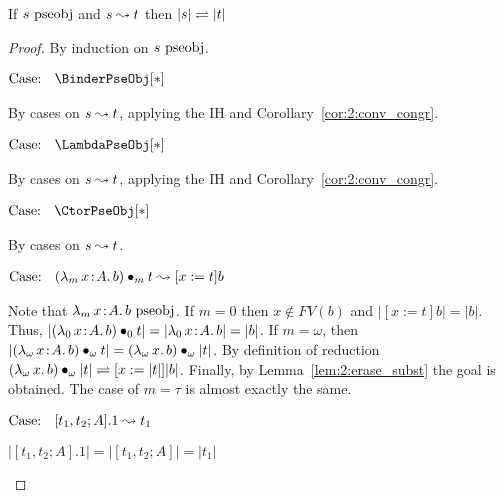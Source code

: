 \begin{lemma}
    If $s~\mbox{\normalfont pseobj}$ and $s \leadsto t$ then $|s| \rightleftharpoons |t|$
    \label{lem:2:erase_pseobj_red}
\end{lemma}
\begin{proof}
    By induction on $s~\mbox{\normalfont pseobj}$.

    $\text{Case: }\begin{array}{c} \BinderPseObj[*] \end{array}$
    \begin{proofcase}
        By cases on $s \leadsto t$, applying the IH and Corollary~\ref{cor:2:conv_congr}.
    \end{proofcase}

    $\text{Case: }\begin{array}{c} \LambdaPseObj[*] \end{array}$
    \begin{proofcase}
        By cases on $s \leadsto t$, applying the IH and Corollary~\ref{cor:2:conv_congr}.
    \end{proofcase}

    $\text{Case: }\begin{array}{c} \CtorPseObj[*] \end{array}$
    \begin{proofcase}
        By cases on $s \leadsto t$.

        $\text{Case: }\begin{array}{c} ({\lambda_m}\, x\! : \! A.\, b) \bullet_{m} t \leadsto [x := t]b \end{array}$
        \begin{proofcase}
            Note that ${\lambda_m}\, x\! : \! A.\, b~\mbox{\normalfont pseobj}$.
            If $m = 0$ then $x \notin FV(b)$ and $|[x := t]b| = |b|$.
            Thus, $|({\lambda_0}\, x\! : \! A.\, b) \bullet_{0} t| = |{\lambda_0}\, x\! : \! A.\, b| = |b|$.
            If $m = \omega$, then $|({\lambda_\omega}\, x\! : \! A.\, b) \bullet_{\omega} t| = ({\lambda_\omega}\, x.\, b) \bullet_{\omega} |t|$.
            By definition of reduction $({\lambda_\omega}\, x.\, b) \bullet_{\omega} |t| \rightleftharpoons [x := |t|]|b|$.
            Finally, by Lemma~\ref{lem:2:erase_subst} the goal is obtained.
            The case of $m = \tau$ is almost exactly the same.
        \end{proofcase}

        $\text{Case: }\begin{array}{c} [t_1, t_2; A].1 \leadsto t_1 \end{array}$
        \begin{proofcase}
            $|[t_1, t_2; A].1| = |[t_1, t_2; A]| = |t_1|$
        \end{proofcase}


\end{proofcase}
\end{proof}
